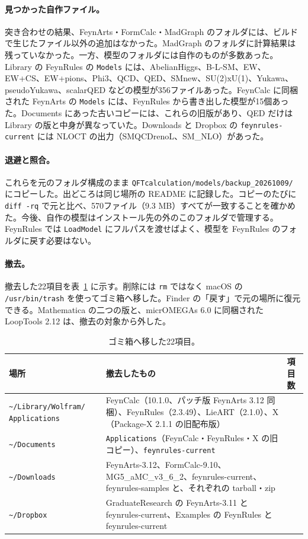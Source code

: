 \documentclass[a4paper,10pt]{ltjsarticle}
\newcommand{\pth}[1]{\texttt{\textasciitilde/}\nolinkurl{#1}}
\begin{document}
\paragraph{見つかった自作ファイル。}突き合わせの結果、FeynArts・FormCalc・MadGraph のフォルダには、ビルドで生じたファイル以外の追加はなかった。MadGraph のフォルダに計算結果は残っていなかった。一方、模型のフォルダには自作のものが多数あった。Library の FeynRules の \texttt{Models} には、AbelianHiggs、B-L-SM、EW、EW+CS、EW+pions、Phi3、QCD、QED、SMnew、SU(2)xU(1)、Yukawa、pseudoYukawa、scalarQED などの模型が356ファイルあった。FeynCalc に同梱された FeynArts の \texttt{Models} には、FeynRules から書き出した模型が15個あった。Documents にあった古いコピーには、これらの旧版があり、QED だけは Library の版と中身が異なっていた。Downloads と Dropbox の \texttt{feynrules-current} には NLOCT の出力（SMQCDrenoL、SM\_NLO）があった。

\paragraph{退避と照合。}これらを元のフォルダ構成のまま \nolinkurl{QFTcalculation/models/backup_20261009/} にコピーした。出どころは同じ場所の README に記録した。コピーのたびに \texttt{diff -rq} で元と比べ、570ファイル（9.3 MB）すべてが一致することを確かめた。今後、自作の模型はインストール先の外のこのフォルダで管理する。FeynRules では \texttt{LoadModel} にフルパスを渡せばよく、模型を FeynRules のフォルダに戻す必要はない。

\paragraph{撤去。}撤去した22項目を表~\ref{tab:removed} に示す。削除には \texttt{rm} ではなく macOS の \texttt{/usr/bin/trash} を使ってゴミ箱へ移した。Finder の「戻す」で元の場所に復元できる。Mathematica の二つの版と、micrOMEGAs 6.0 に同梱された LoopTools 2.12 は、撤去の対象から外した。

\begin{table}[tbp]
\centering\small
\caption{ゴミ箱へ移した22項目。}
\label{tab:removed}
\begin{tabularx}{\linewidth}{>{\raggedright\arraybackslash}p{3.4cm}X>{\raggedleft\arraybackslash}p{1.0cm}}
\toprule
\textbf{場所} & \textbf{撤去したもの} & \textbf{項目数} \\
\midrule
\pth{Library/Wolfram/} \nolinkurl{Applications} & FeynCalc（10.1.0、パッチ版 FeynArts 3.12 同梱）、FeynRules（2.3.49）、LieART（2.1.0）、X（Package-X 2.1.1 の旧配布版） & 4 \\
\pth{Documents} & \texttt{Applications}（FeynCalc・FeynRules・X の旧コピー）、\texttt{feynrules-current} & 2 \\
\pth{Downloads} & FeynArts-3.12、FormCalc-9.10、MG5\_aMC\_v3\_6\_2、feynrules-current、feynrules-samples と、それぞれの tarball・zip & 12 \\
\pth{Dropbox} & GraduateResearch の FeynArts-3.11 と feynrules-current、Examples の FeynRules と feynrules-current & 4 \\
\bottomrule
\end{tabularx}
\end{table}
\end{document}
